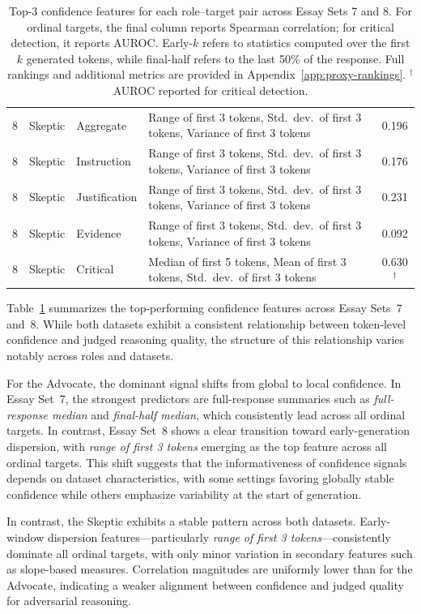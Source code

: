 \documentclass[11pt]{article}
\begin{document}
\begin{table}[t]
\begin{tabular}{l l l l c}
\midrule
8 & Skeptic  & Aggregate     & Range of first 3 tokens, Std.\ dev.\ of first 3 tokens, Variance of first 3 tokens & 0.196 \\
8 & Skeptic  & Instruction   & Range of first 3 tokens, Std.\ dev.\ of first 3 tokens, Variance of first 3 tokens & 0.176 \\
8 & Skeptic  & Justification & Range of first 3 tokens, Std.\ dev.\ of first 3 tokens, Variance of first 3 tokens & 0.231 \\
8 & Skeptic  & Evidence      & Range of first 3 tokens, Std.\ dev.\ of first 3 tokens, Variance of first 3 tokens & 0.092 \\
8 & Skeptic  & Critical      & Median of first 5 tokens, Mean of first 3 tokens, Std.\ dev.\ of first 3 tokens & 0.630$^\dagger$ \\
\bottomrule
\end{tabular}
\caption{Top-3 confidence features for each role--target pair across Essay Sets 7 and 8. For ordinal targets, the final column reports Spearman correlation; for critical detection, it reports AUROC. Early-$k$ refers to statistics computed over the first $k$ generated tokens, while final-half refers to the last 50\% of the response. Full rankings and additional metrics are provided in Appendix~\ref{app:proxy-rankings}. $^\dagger$AUROC reported for critical detection.}
\label{tab:cross-dataset-top3}
\end{table}
Table~\ref{tab:cross-dataset-top3} summarizes the top-performing confidence features across Essay Sets~7 and~8. While both datasets exhibit a consistent relationship between token-level confidence and judged reasoning quality, the structure of this relationship varies notably across roles and datasets.

For the Advocate, the dominant signal shifts from global to local confidence. In Essay Set~7, the strongest predictors are full-response summaries such as \emph{full-response median} and \emph{final-half median}, which consistently lead across all ordinal targets. In contrast, Essay Set~8 shows a clear transition toward early-generation dispersion, with \emph{range of first 3 tokens} emerging as the top feature across all ordinal targets. This shift suggests that the informativeness of confidence signals depends on dataset characteristics, with some settings favoring globally stable confidence while others emphasize variability at the start of generation.

In contrast, the Skeptic exhibits a stable pattern across both datasets. Early-window dispersion features—particularly \emph{range of first 3 tokens}—consistently dominate all ordinal targets, with only minor variation in secondary features such as slope-based measures. Correlation magnitudes are uniformly lower than for the Advocate, indicating a weaker alignment between confidence and judged quality for adversarial reasoning.
\end{document}

